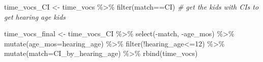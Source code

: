 \documentclass[
]{article}
\newenvironment{Shaded}{\begin{snugshade}}{\end{snugshade}}
\newcommand{\AttributeTok}[1]{\textcolor[rgb]{0.77,0.63,0.00}{#1}}
\newcommand{\CommentTok}[1]{\textcolor[rgb]{0.56,0.35,0.01}{\textit{#1}}}
\newcommand{\DecValTok}[1]{\textcolor[rgb]{0.00,0.00,0.81}{#1}}
\newcommand{\FunctionTok}[1]{\textcolor[rgb]{0.00,0.00,0.00}{#1}}
\newcommand{\NormalTok}[1]{#1}
\newcommand{\OtherTok}[1]{\textcolor[rgb]{0.56,0.35,0.01}{#1}}
\newcommand{\SpecialCharTok}[1]{\textcolor[rgb]{0.00,0.00,0.00}{#1}}
\newcommand{\StringTok}[1]{\textcolor[rgb]{0.31,0.60,0.02}{#1}}
\begin{document}
\begin{Shaded}
\begin{Highlighting}[]
\NormalTok{time\_vocs\_CI }\OtherTok{\textless{}{-}}\NormalTok{ time\_vocs }\SpecialCharTok{\%\textgreater{}\%} \FunctionTok{filter}\NormalTok{(match}\SpecialCharTok{==}\StringTok{\textquotesingle{}CI\textquotesingle{}}\NormalTok{) }\CommentTok{\# get the kids with CIs to get hearing age kids }

\NormalTok{time\_vocs\_final }\OtherTok{\textless{}{-}}\NormalTok{ time\_vocs\_CI }\SpecialCharTok{\%\textgreater{}\%}
  \FunctionTok{select}\NormalTok{(}\SpecialCharTok{{-}}\NormalTok{match, }\SpecialCharTok{{-}}\NormalTok{age\_mos) }\SpecialCharTok{\%\textgreater{}\%}
  \FunctionTok{mutate}\NormalTok{(}\AttributeTok{age\_mos=}\NormalTok{hearing\_age) }\SpecialCharTok{\%\textgreater{}\%}
  \FunctionTok{filter}\NormalTok{(}\SpecialCharTok{!}\NormalTok{hearing\_age}\SpecialCharTok{\textless{}=}\DecValTok{12}\NormalTok{) }\SpecialCharTok{\%\textgreater{}\%}
  \FunctionTok{mutate}\NormalTok{(}\AttributeTok{match=}\StringTok{\textquotesingle{}CI\_by\_hearing\_age\textquotesingle{}}\NormalTok{) }\SpecialCharTok{\%\textgreater{}\%}
  \FunctionTok{rbind}\NormalTok{(time\_vocs)}
\end{Highlighting}
\end{Shaded}
\end{document}
